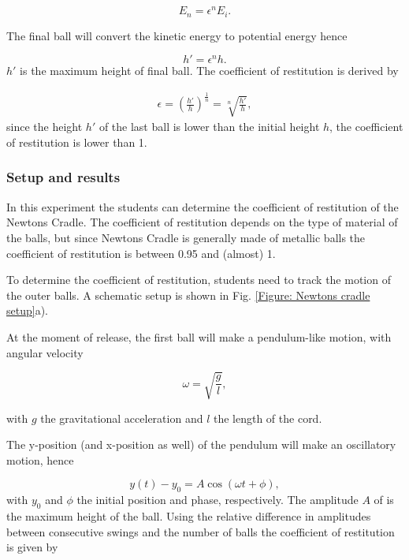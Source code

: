 \documentclass{article}
\begin{document}
\begin{equation}
    E_n = \epsilon^n E_i.
\end{equation}

The final ball will convert the kinetic energy to potential energy hence

\begin{equation}
    h' = \epsilon^n h.
\end{equation}
$h'$ is the maximum height of final ball. The coefficient of restitution is derived by

\begin{align}
    \epsilon = \left(\frac{h'}{h}\right)^{\frac{1}{n}}  = \sqrt[n]{\frac{h'}{h}},
\end{align}
since the height $h'$ of the last ball is lower than the initial height $h$, the coefficient of restitution is lower than 1.


\subsubsection{Setup and results}
In this experiment the students can determine the coefficient of restitution of the Newtons Cradle. The coefficient of restitution depends on the type of material of the balls, but since Newtons Cradle is generally made of metallic balls the coefficient of restitution is between 0.95 and (almost) 1.

To determine the coefficient of restitution, students need to track the motion of the outer balls. A schematic setup is shown in Fig. \ref{Figure: Newtons cradle setup}a).

At the moment of release, the first ball will make a pendulum-like motion, with angular velocity

\begin{equation}
    \omega = \sqrt{\frac{g}{l}},
\end{equation}

with $g$ the gravitational acceleration and $l$ the length of the cord. 

The y-position (and x-position as well) of the pendulum will make an oscillatory motion, hence

\begin{equation}
    y(t) - y_0= A\cos(\omega t + \phi),
\end{equation}
with $y_0$ and $\phi$ the initial position and phase, respectively. The amplitude $A$ of is the maximum height of the ball. Using the relative difference in amplitudes between consecutive swings and the number of balls the coefficient of restitution is given by
\end{document}
